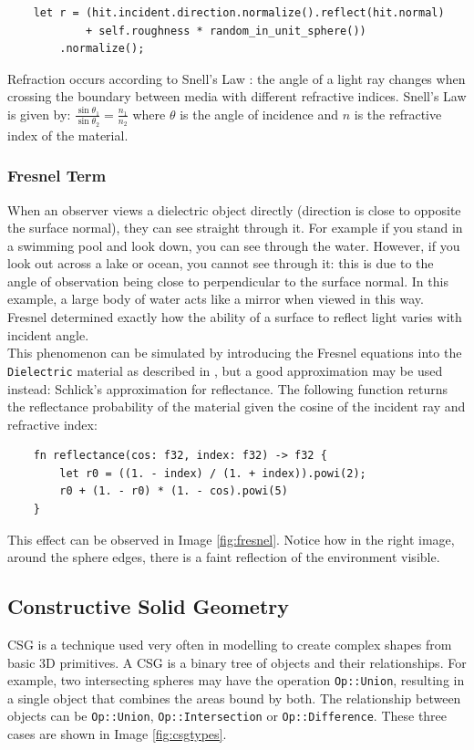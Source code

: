 \documentclass[a4paper]{article}
\begin{document}
\begin{verbatim}
    let r = (hit.incident.direction.normalize().reflect(hit.normal)
            + self.roughness * random_in_unit_sphere())
        .normalize();
\end{verbatim}

Refraction occurs according to Snell's Law : the angle of a light ray changes when crossing the boundary between media with different refractive indices. Snell's Law is given by: $\frac{\sin \theta_{1}}{\sin \theta_{2}} = \frac{n_{1}}{n_{2}}$ where $\theta$ is the angle of incidence and $n$ is the refractive index of the material.

\subsubsection{Fresnel Term} When an observer views a dielectric object directly (direction is close to opposite the surface normal), they can see straight through it. For example if you stand in a swimming pool and look down, you can see through the water. However, if you look out across a lake or ocean, you cannot see through it: this is due to the angle of observation being close to perpendicular to the surface normal. In this example, a large body of water acts like a mirror when viewed in this way. Fresnel determined exactly how the ability of a surface to reflect light varies with incident angle.\\

This phenomenon can be simulated by introducing the Fresnel equations into the \texttt{Dielectric} material as described in \cite{Suffern2016ray}, but a good approximation may be used instead: Schlick's approximation \cite{Schlick1994approx} for reflectance. The following function returns the reflectance probability of the material given the cosine of the incident ray and refractive index:

\begin{verbatim}
    fn reflectance(cos: f32, index: f32) -> f32 {
        let r0 = ((1. - index) / (1. + index)).powi(2);
        r0 + (1. - r0) * (1. - cos).powi(5)
    }
\end{verbatim}

This effect can be observed in Image \ref{fig:fresnel}. Notice how in the right image, around the sphere edges, there is a faint reflection of the environment visible.

\subsection{Constructive Solid Geometry}
CSG is a technique used very often in modelling to create complex shapes from basic 3D primitives. A CSG is a binary tree of objects and their relationships. For example, two intersecting spheres may have the operation \texttt{Op::Union}, resulting in a single object that combines the areas bound by both. The relationship between objects can be \texttt{Op::Union}, \texttt{Op::Intersection} or \texttt{Op::Difference}. These three cases are shown in Image \ref{fig:csgtypes}.
\end{document}
